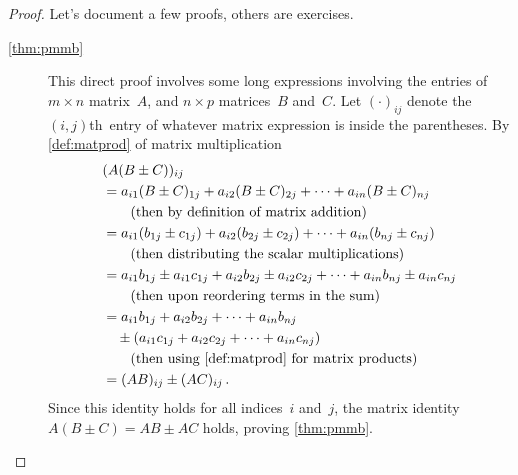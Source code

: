 \begin{proof} 
Let's document a few proofs, others are exercises.
\begin{description}
\item[\ref{thm:pmmb}]
This direct proof involves some long expressions involving the entries of \(m\times n\) matrix~\(A\), and \(n\times p\) matrices~\(B\) and~\(C\).
Let \((\cdot)_{ij}\) denote the \((i,j)\)th~entry of whatever matrix expression is inside the parentheses.
By \cref{def:matprod} of matrix multiplication
\begin{align*}
&(A(B\pm C))_{ij}
\\&=a_{i1}(B\pm C)_{1j}+a_{i2}(B\pm C)_{2j}+\cdots+a_{in}(B\pm C)_{nj}
\\&\qquad(\text{then by definition of matrix addition})
\\&=a_{i1}(b_{1j}\pm c_{1j})+a_{i2}(b_{2j}\pm c_{2j})+\cdots+a_{in}(b_{nj}\pm c_{nj})
\\&\qquad(\text{then distributing the scalar multiplications})
\\&=a_{i1}b_{1j}\pm a_{i1}c_{1j}+a_{i2}b_{2j}\pm a_{i2}c_{2j}+\cdots+a_{in}b_{nj}\pm a_{in}c_{nj}
\\&\qquad(\text{then upon reordering terms in the sum})
\\&=a_{i1}b_{1j}+a_{i2}b_{2j}+\cdots+a_{in}b_{nj}
\\&\quad{}\pm (a_{i1}c_{1j}+ a_{i2}c_{2j}+\cdots +a_{in}c_{nj})
\\&\qquad(\text{then using \cref{def:matprod} for matrix products})
\\&=(AB)_{ij} \pm (AC)_{ij}\,.
\end{align*}
Since this identity holds for all indices~\(i\) and~\(j\), the matrix identity \(A(B\pm C)=AB\pm AC\) holds, proving \cref{thm:pmmb}.



\end{description}
\end{proof}
